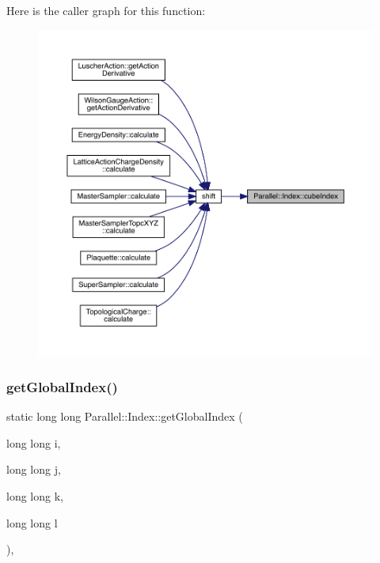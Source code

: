 Here is the caller graph for this function\+:\nopagebreak
\begin{figure}[H]
\begin{center}
\leavevmode
\includegraphics[width=350pt]{class_parallel_1_1_index_ac406d7ceb12e986a66d64ef98fcef5d3_icgraph}
\end{center}
\end{figure}
\mbox{\label{class_parallel_1_1_index_aaa2650024b4e91dc86d2bdc568c8f57d}} 
\subsubsection{\texorpdfstring{getGlobalIndex()}{getGlobalIndex()}}
{\footnotesize\ttfamily static long long Parallel\+::\+Index\+::get\+Global\+Index (\begin{DoxyParamCaption}\item[{long long}]{i,  }\item[{long long}]{j,  }\item[{long long}]{k,  }\item[{long long}]{l }\end{DoxyParamCaption})\hspace{0.3cm}{\ttfamily [inline]}, {\ttfamily [static]}}

